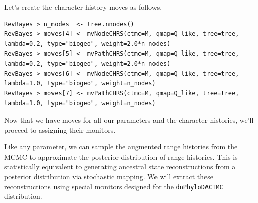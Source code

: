 \documentclass[11pt]{article}
\begin{document}
Let's create the character history moves as follows.

\begin{snugshade}
\begin{lstlisting}
RevBayes > n_nodes  <- tree.nnodes()
RevBayes > moves[4] <- mvNodeCHRS(ctmc=M, qmap=Q_like, tree=tree, lambda=0.2, type="biogeo", weight=2.0*n_nodes)
RevBayes > moves[5] <- mvPathCHRS(ctmc=M, qmap=Q_like, tree=tree, lambda=0.2, type="biogeo", weight=2.0*n_nodes)
RevBayes > moves[6] <- mvNodeCHRS(ctmc=M, qmap=Q_like, tree=tree, lambda=1.0, type="biogeo", weight=n_nodes)
RevBayes > moves[7] <- mvPathCHRS(ctmc=M, qmap=Q_like, tree=tree, lambda=1.0, type="biogeo", weight=n_nodes)
\end{lstlisting}
\end{snugshade}

Now that we have moves for all our parameters and the character histories, we'll proceed to assigning their monitors.

Like any parameter, we can sample the augmented range histories from the MCMC to approximate the posterior distribution of range histories.
This is statistically equivalent to generating ancestral state reconstructions from a posterior distribution via stochastic mapping.
We will extract these reconstructions using special monitors designed for the {\tt dnPhyloDACTMC} distribution.
\end{document}
